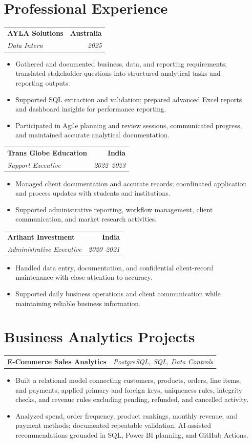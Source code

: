 \documentclass[letterpaper,10pt]{article}
\makeatletter
\newcommand{\role}[4]{%
  \begin{tabularx}{\textwidth}{@{}Xr@{}}
    \textbf{#1} & \textbf{#2} \\
    \textit{#3} & \textit{#4}
  \end{tabularx}\vspace{-1pt}
}
\newcommand{\project}[2]{%
  \begin{tabularx}{\textwidth}{@{}Xr@{}}
    \textbf{#1} & \textit{#2}
  \end{tabularx}\vspace{-1pt}
}
\makeatother
\begin{document}
\section{Professional Experience}
\role{AYLA Solutions}{Australia}{Data Intern}{2025}
\begin{itemize}
  \item Gathered and documented business, data, and reporting requirements; translated stakeholder questions into structured analytical tasks and reporting outputs.
  \item Supported SQL extraction and validation; prepared advanced Excel reports and dashboard insights for performance reporting.
  \item Participated in Agile planning and review sessions, communicated progress, and maintained accurate analytical documentation.
\end{itemize}
\vspace{1pt}

\role{Trans Globe Education}{India}{Support Executive}{2022--2023}
\begin{itemize}
  \item Managed client documentation and accurate records; coordinated application and process updates with students and institutions.
  \item Supported administrative reporting, workflow management, client communication, and market research activities.
\end{itemize}
\vspace{1pt}

\role{Arihant Investment}{India}{Administrative Executive}{2020--2021}
\begin{itemize}
  \item Handled data entry, documentation, and confidential client-record maintenance with close attention to accuracy.
  \item Supported daily business operations and client communication while maintaining reliable business information.
\end{itemize}

\section{Business Analytics Projects}
\project{\href{https://github.com/jainalimehta/Ecommerce-Sales-Analytics}{E-Commerce Sales Analytics}}{PostgreSQL, SQL, Data Controls}
\begin{itemize}
  \item Built a relational model connecting customers, products, orders, line items, and payments; applied primary and foreign keys, uniqueness rules, integrity checks, and revenue rules excluding pending, refunded, and cancelled activity.
  \item Analyzed spend, order frequency, product rankings, monthly revenue, and payment methods; documented repeatable validation, AI-assisted recommendations grounded in SQL, Power BI planning, and GitHub Actions.
\end{itemize}
\vspace{1pt}
\end{document}
